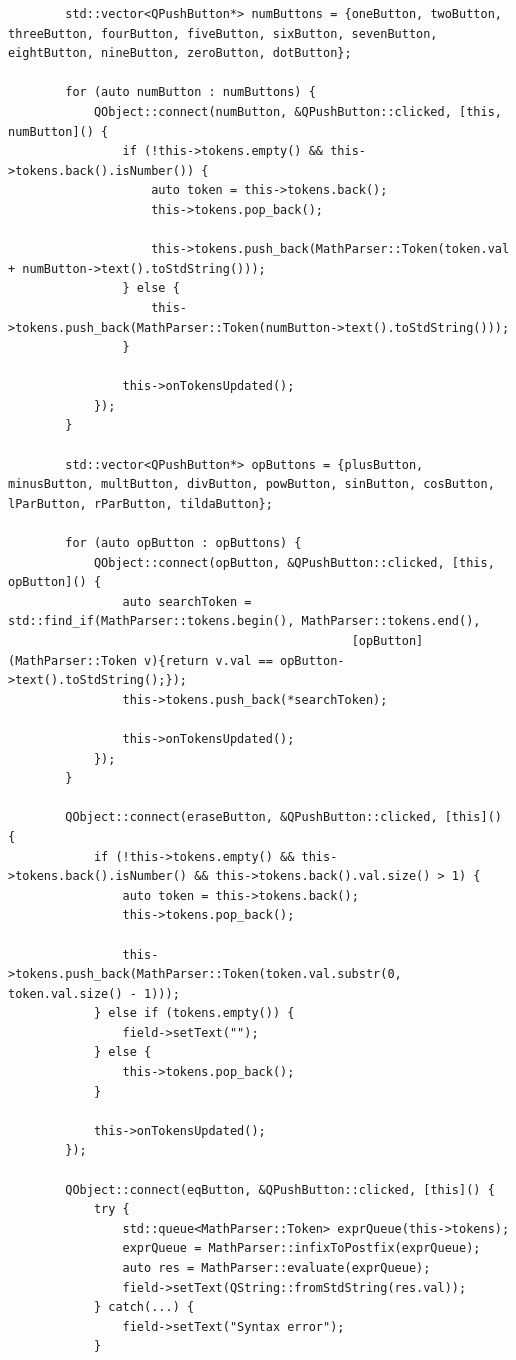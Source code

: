 \documentclass[a4paper,14pt]{extarticle}
\begin{document}
\begin{verbatim}
        std::vector<QPushButton*> numButtons = {oneButton, twoButton, threeButton, fourButton, fiveButton, sixButton, sevenButton, eightButton, nineButton, zeroButton, dotButton};

        for (auto numButton : numButtons) {
            QObject::connect(numButton, &QPushButton::clicked, [this, numButton]() {
                if (!this->tokens.empty() && this->tokens.back().isNumber()) {
                    auto token = this->tokens.back();
                    this->tokens.pop_back();

                    this->tokens.push_back(MathParser::Token(token.val + numButton->text().toStdString()));
                } else {
                    this->tokens.push_back(MathParser::Token(numButton->text().toStdString()));
                }

                this->onTokensUpdated();
            });
        }

        std::vector<QPushButton*> opButtons = {plusButton, minusButton, multButton, divButton, powButton, sinButton, cosButton, lParButton, rParButton, tildaButton};

        for (auto opButton : opButtons) {
            QObject::connect(opButton, &QPushButton::clicked, [this, opButton]() {
                auto searchToken = std::find_if(MathParser::tokens.begin(), MathParser::tokens.end(),
                                                [opButton](MathParser::Token v){return v.val == opButton->text().toStdString();});
                this->tokens.push_back(*searchToken);

                this->onTokensUpdated();
            });
        }

        QObject::connect(eraseButton, &QPushButton::clicked, [this]() {
            if (!this->tokens.empty() && this->tokens.back().isNumber() && this->tokens.back().val.size() > 1) {
                auto token = this->tokens.back();
                this->tokens.pop_back();

                this->tokens.push_back(MathParser::Token(token.val.substr(0, token.val.size() - 1)));
            } else if (tokens.empty()) {
                field->setText("");
            } else {
                this->tokens.pop_back();
            }

            this->onTokensUpdated();
        });

        QObject::connect(eqButton, &QPushButton::clicked, [this]() {
            try {
                std::queue<MathParser::Token> exprQueue(this->tokens);
                exprQueue = MathParser::infixToPostfix(exprQueue);
                auto res = MathParser::evaluate(exprQueue);
                field->setText(QString::fromStdString(res.val));
            } catch(...) {
                field->setText("Syntax error");
            }


\end{verbatim}
\end{document}
